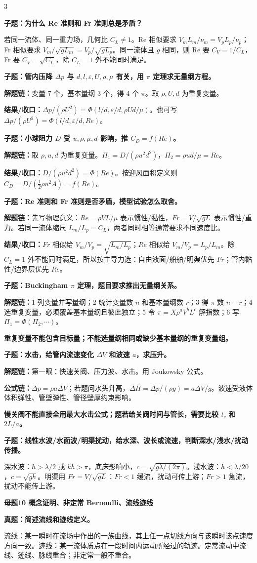 \documentclass[a4paper]{article}
\newcommand{\mt}[1]{\vspace{0.45pt}\colorbox{M}{\parbox{\dimexpr\linewidth-2\fboxsep}{\color{white}\bfseries #1}}\par}
\newcommand{\qt}[1]{\vspace{0.25pt}\colorbox{Q}{\parbox{\dimexpr\linewidth-2\fboxsep}{\color{white}\bfseries #1}}\par}
\newcommand{\ans}[1]{\colorbox{G}{\parbox{\dimexpr\linewidth-2\fboxsep}{#1}}\par}
\newcommand{\warn}[1]{\colorbox{Y}{\parbox{\dimexpr\linewidth-2\fboxsep}{\color{E}\bfseries #1}}\par}
\newcommand{\chain}[1]{{\color{A}\bfseries 解题链：}#1\par}
\newcommand{\res}[1]{{\color{E}\bfseries 结果/收口：}#1\par}
\newcommand{\form}[1]{{\color{M}\bfseries 公式链：}#1\par}
\begin{document}
\begin{multicols}{3}
\qt{子题：为什么 Re 准则和 Fr 准则总是矛盾？}
\ans{若同一流体、同一重力场，几何比 $C_L\ne1$。Re 相似要求 $V_mL_m/\nu_m=V_pL_p/\nu_p$；Fr 相似要求 $V_m/\sqrt{gL_m}=V_p/\sqrt{gL_p}$。同一流体且 $g$ 相同，则 Re 要 $C_V=1/C_L$，Fr 要 $C_V=\sqrt{C_L}$，除 $C_L=1$ 外不能同时满足。}

\qt{子题：管内压降 $\Delta p$ 与 $d,l,\varepsilon,U,\rho,\mu$ 有关，用 $\pi$ 定理求无量纲方程。}
\chain{变量 7 个，基本量纲 3 个，得 4 个 $\pi$。取 $\rho,U,d$ 为重复变量。}
\res{$\Delta p/(\rho U^2)=\Phi(l/d,\varepsilon/d,\rho Ud/\mu)$。也可写 $\Delta p/(\rho U^2)=\Phi(l/d,\varepsilon/d,Re)$。}

\qt{子题：小球阻力 $D$ 受 $u,\rho,\mu,d$ 影响，推 $C_D=f(Re)$。}
\chain{取 $\rho,u,d$ 为重复变量。$\Pi_1=D/(\rho u^2d^2)$，$\Pi_2=\rho ud/\mu=Re$。}
\res{$D/(\rho u^2d^2)=\Phi(Re)$。按迎风面积定义则 $C_D=D/(\frac12\rho u^2A)=f(Re)$。}

\qt{子题：Re 准则和 Fr 准则是否矛盾，模型试验怎么取舍。}
\chain{先写物理意义：$Re=\rho VL/\mu$ 表示惯性/黏性，$Fr=V/\sqrt{gL}$ 表示惯性/重力。若同一流体缩尺 $L_m/L_p=C_L$，两者同时相等通常要求不同速度比。}
\res{$Fr$ 相似给 $V_m/V_p=\sqrt{L_m/L_p}$；$Re$ 相似给 $V_m/V_p=L_p/L_m$。除 $C_L=1$ 外不能同时满足，所以按主导力选：自由液面/船舶/明渠优先 $Fr$；管内黏性/边界层优先 $Re$。}

\qt{子题：Buckingham $\pi$ 定理，题目要求推出无量纲关系。}
\chain{1 列变量并写量纲；2 统计变量数 $n$ 和基本量纲数 $r$；3 得 $\pi$ 数 $n-r$；4 选重复变量，必须覆盖基本量纲且彼此独立；5 令 $\pi=X\rho^aV^bL^c$ 解指数；6 写 $\Pi_1=\Phi(\Pi_2,\cdots)$。}
\warn{重复变量不能包含目标量；不能选量纲相同或缺少基本量纲的重复变量组。}

\qt{子题：水击，给管内流速变化 $\Delta V$ 和波速 $a$，求压升。}
\chain{第一眼：快速关阀、压力波、水击。用 Joukowsky 公式。}
\form{$\Delta p=\rho a\Delta V$；若题问水头升高，$\Delta H=\Delta p/(\rho g)=a\Delta V/g$。波速受液体体积弹性、管壁弹性、管径壁厚约束影响。}
\warn{慢关阀不能直接全用最大水击公式；题若给关阀时间与管长，需要比较 $t_c$ 和 $2L/a$。}

\qt{子题：线性水波/水面波/明渠扰动，给水深、波长或流速，判断深水/浅水/扰动传播。}
\ans{深水波：$h>\lambda/2$ 或 $kh>\pi$，底床影响小，$c=\sqrt{g\lambda/(2\pi)}$。浅水波：$h<\lambda/20$，$c=\sqrt{gh}$。明渠用 $Fr=V/\sqrt{gL}$：$Fr<1$ 缓流，扰动可传上游；$Fr>1$ 急流，扰动不能传上游。}


\mt{母题10 概念证明、非定常 Bernoulli、流线迹线}
\qt{真题：简述流线和迹线定义。}
\ans{流线：某一瞬时在流场中作出的一族曲线，其上任一点切线方向与该瞬时该点速度方向一致。迹线：某一流体质点在一段时间内运动所经过的轨迹。定常流动中流线、迹线、脉线重合；非定常一般不重合。}


\end{multicols}
\end{document}
